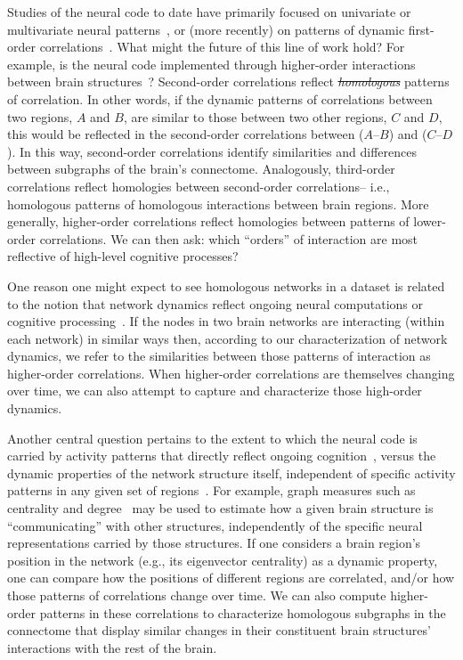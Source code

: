 \documentclass[english]{article}
\providecommand{\DIFaddtex}[1]{{\protect\color{blue}\uwave{#1}}} %
\providecommand{\DIFdeltex}[1]{{\protect\color{red}\sout{#1}}}                      %
\providecommand{\DIFaddbegin}{} %
\providecommand{\DIFaddend}{} %
\providecommand{\DIFdelbegin}{} %
\providecommand{\DIFdelend}{} %
\providecommand{\DIFadd}[1]{\texorpdfstring{\DIFaddtex{#1}}{#1}} %
\providecommand{\DIFdel}[1]{\texorpdfstring{\DIFdeltex{#1}}{}} %
\newcommand{\DIFscaledelfig}{0.5}
\newlength{\DIFdelgraphicswidth} %
\newlength{\DIFdelgraphicsheight} %
\newcommand{\DIFaddincludegraphics}[2][]{{\color{blue}\fbox{\DIFOincludegraphics[#1]{#2}}}} %
\newcommand{\DIFdelincludegraphics}[2][]{%
\sbox{\DIFdelgraphicsbox}{\DIFOincludegraphics[#1]{#2}}%
\settoboxwidth{\DIFdelgraphicswidth}{\DIFdelgraphicsbox} %
\settoboxtotalheight{\DIFdelgraphicsheight}{\DIFdelgraphicsbox} %
\scalebox{\DIFscaledelfig}{%
\parbox[b]{\DIFdelgraphicswidth}{\usebox{\DIFdelgraphicsbox}\\[-\baselineskip] \rule{\DIFdelgraphicswidth}{0em}}\llap{\resizebox{\DIFdelgraphicswidth}{\DIFdelgraphicsheight}{%
\setlength{\unitlength}{\DIFdelgraphicswidth}%
\begin{picture}(1,1)%
\thicklines\linethickness{2pt} %
{\color[rgb]{1,0,0}\put(0,0){\framebox(1,1){}}}%
{\color[rgb]{1,0,0}\put(0,0){\line( 1,1){1}}}%
{\color[rgb]{1,0,0}\put(0,1){\line(1,-1){1}}}%
\end{picture}%
}\hspace*{3pt}}} %
} %
\DeclareRobustCommand{\DIFaddbegin}{\DIFOaddbegin \let\includegraphics\DIFaddincludegraphics} %
\DeclareRobustCommand{\DIFaddend}{\DIFOaddend \let\includegraphics\DIFOincludegraphics} %
\DeclareRobustCommand{\DIFdelbegin}{\DIFOdelbegin \let\includegraphics\DIFdelincludegraphics} %
\DeclareRobustCommand{\DIFdelend}{\DIFOaddend \let\includegraphics\DIFOincludegraphics} %
\begin{document}
Studies of the neural code to date have primarily focused on
univariate or multivariate neural patterns~\citep[for review
see][]{NormEtal06b}, or (more recently) on patterns of dynamic
first-order correlations~\citep[i.e., interactions between pairs of
brain structures;][]{MannEtal18, FongEtal19, LuriEtal18, PretEtal17,
  ZouEtal19, DemeEtal19}.  What might the future of this line of work
hold?  For example, is the neural code implemented through
higher-order interactions between brain structures~\citep[e.g.,
see][]{ReimEtal17}?  Second-order correlations reflect
\DIFdelbegin \textit{\DIFdel{homologous}} %
\DIFdelend \DIFaddbegin \DIFadd{homologous }\DIFaddend patterns of correlation.  In other words, if the
dynamic patterns of correlations between two regions, $A$ and $B$, are
similar to those between two other regions, $C$ and $D$, this would be
reflected in the second-order correlations between ($A$--$B$) and
($C$--$D$).  In this way, second-order correlations identify
similarities and differences between subgraphs of the brain's
connectome.  Analogously, third-order correlations reflect homologies
between second-order correlations-- i.e., homologous patterns of
homologous interactions between brain regions.  More generally,
higher-order correlations reflect homologies between patterns of
lower-order correlations.  We can then ask: which ``orders'' of
interaction are most reflective of high-level cognitive processes?

One reason one might expect to see homologous networks in a dataset is
related to the notion that network dynamics reflect ongoing neural
computations or cognitive processing~\citep[e.g.,][]{BeatEtal16}.  If
the nodes in two brain networks are interacting (within each network)
in similar ways then, according to our characterization of network
dynamics, we refer to the similarities between those patterns of
interaction as higher-order correlations.  When higher-order
correlations are themselves changing over time, we can also attempt to
capture and characterize those high-order dynamics.

Another central question pertains to the extent to which the neural
code is carried by activity patterns that directly reflect ongoing
cognition~\citep[e.g., following][]{HaxbEtal01, NormEtal06b}, versus
the dynamic properties of the network structure itself, independent of
specific activity patterns in any given set of regions~\citep[e.g.,
following][]{BassEtal06}.  For example, graph measures such as
centrality and degree~\citep{BullSpor09} may be used to estimate how a
given brain structure is ``communicating'' with other structures,
independently of the specific neural representations carried by those
structures.  If one considers a brain region's position in the network
(e.g., its eigenvector centrality) as a dynamic property, one can
compare how the positions of different regions are correlated, and/or
how those patterns of correlations change over time.  We can also
compute higher-order patterns in these correlations to characterize
homologous subgraphs in the connectome that display similar changes in
their constituent brain structures' interactions with the rest of the
brain.
\end{document}
